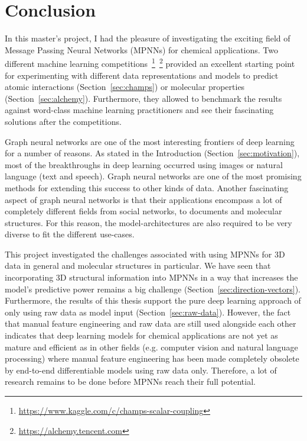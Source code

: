 \chapter{Conclusion}
\label{chapter:Conclusion}

In this master's project, I had the pleasure of investigating the exciting field of Message Passing Neural Networks (MPNNs) for chemical applications. Two different machine learning competitions~\footnote{\url{https://www.kaggle.com/c/champs-scalar-coupling}}~\footnote{\url{https://alchemy.tencent.com}} provided an excellent starting point for experimenting with different data representations and models to predict atomic interactions (Section~\ref{sec:champs}) or molecular properties (Section~\ref{sec:alchemy}). Furthermore, they allowed to benchmark the results against word-class machine learning practitioners and see their fascinating solutions after the competitions.

Graph neural networks are one of the most interesting frontiers of deep learning for a number of reasons. As stated in the Introduction (Section~\ref{sec:motivation}), most of the breakthroughs in deep learning occurred using images or natural language (text and speech). Graph neural networks are one of the most promising methods for extending this success to other kinds of data. Another fascinating aspect of graph neural networks is that their applications encompass a lot of completely different fields from social networks, to documents and molecular structures. For this reason, the model-architectures are also required to be very diverse to fit the different use-cases.

This project investigated the challenges associated with using MPNNs for 3D data in general and molecular structures in particular. We have seen that incorporating 3D structural information into MPNNs in a way that increases the model's predictive power remains a big challenge (Section~\ref{sec:direction-vectors}). Furthermore, the results of this thesis support the pure deep learning approach of only using raw data as model input (Section~\ref{sec:raw-data}). However, the fact that manual feature engineering and raw data are still used alongside each other indicates that deep learning models for chemical applications are not yet as mature and efficient as in other fields (e.g. computer vision and natural language processing) where manual feature engineering has been made completely obsolete by end-to-end differentiable models using raw data only. Therefore, a lot of research remains to be done before MPNNs reach their full potential.

